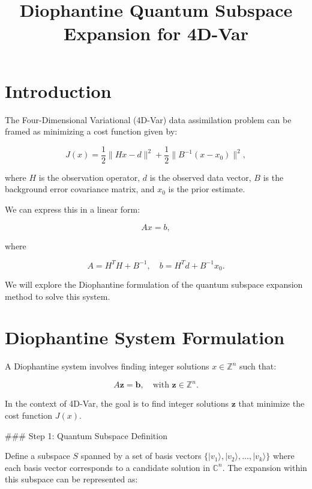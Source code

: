 \documentclass{article}
\title{Diophantine Quantum Subspace Expansion for 4D-Var}
\author{}
\date{}
\begin{document}
\maketitle

\section{Introduction}

The Four-Dimensional Variational (4D-Var) data assimilation problem can be framed as minimizing a cost function given by:

\begin{equation}
J(x) = \frac{1}{2} \| Hx - d \|^2 + \frac{1}{2} \| B^{-1}(x - x_0) \|^2,
\end{equation}

where \( H \) is the observation operator, \( d \) is the observed data vector, \( B \) is the background error covariance matrix, and \( x_0 \) is the prior estimate. 

We can express this in a linear form:

\begin{equation}
Ax = b,
\end{equation}

where

\[
A = H^TH + B^{-1}, \quad b = H^Td + B^{-1}x_0.
\]

We will explore the Diophantine formulation of the quantum subspace expansion method to solve this system.

\section{Diophantine System Formulation}

A Diophantine system involves finding integer solutions \( x \in \mathbb{Z}^n \) such that:

\begin{equation}
A \mathbf{z} = \mathbf{b}, \quad \text{with } \mathbf{z} \in \mathbb{Z}^n.
\end{equation}

In the context of 4D-Var, the goal is to find integer solutions \( \mathbf{z} \) that minimize the cost function \( J(x) \).

### Step 1: Quantum Subspace Definition

Define a subspace \( S \) spanned by a set of basis vectors \( \{|v_1\rangle, |v_2\rangle, \ldots, |v_k\rangle\} \) where each basis vector corresponds to a candidate solution in \( \mathbb{C}^n \). The expansion within this subspace can be represented as:
\end{document}
